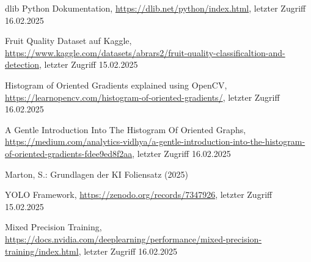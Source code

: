 \documentclass[runningheads]{llncs}
\begin{document}
%
%
%
% 
% 
%
\begin{thebibliography}{8}
dlib Python Dokumentation, \url{https://dlib.net/python/index.html}, letzter Zugriff 16.02.2025

Fruit Quality Dataset auf Kaggle, \url{https://www.kaggle.com/datasets/abrars2/fruit-quality-classificaltion-and-detection}, letzter Zugriff 15.02.2025

Histogram of Oriented Gradients explained using OpenCV, \url{https://learnopencv.com/histogram-of-oriented-gradients/}, letzter Zugriff 16.02.2025

A Gentle Introduction Into The Histogram Of Oriented Graphs, \url{https://medium.com/analytics-vidhya/a-gentle-introduction-into-the-histogram-of-oriented-gradients-fdee9ed8f2aa}, letzter Zugriff 16.02.2025

Marton, S.: Grundlagen der KI Foliensatz (2025)

YOLO Framework, \url{https://zenodo.org/records/7347926}, letzter Zugriff 15.02.2025

Mixed Precision Training, \url{https://docs.nvidia.com/deeplearning/performance/mixed-precision-training/index.html}, letzter Zugriff 16.02.2025




\end{thebibliography}
\end{document}
